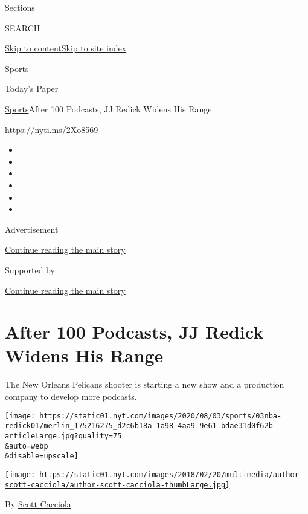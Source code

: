 Sections

SEARCH

\protect\hyperlink{site-content}{Skip to
content}\protect\hyperlink{site-index}{Skip to site index}

\href{https://www.nytimes.com/section/sports}{Sports}

\href{https://myaccount.nytimes.com/auth/login?response_type=cookie\&client_id=vi}{}

\href{https://www.nytimes.com/section/todayspaper}{Today's Paper}

\href{/section/sports}{Sports}\textbar{}After 100 Podcasts, JJ Redick
Widens His Range

\url{https://nyti.ms/2Xo8569}

\begin{itemize}
\item
\item
\item
\item
\item
\item
\end{itemize}

Advertisement

\protect\hyperlink{after-top}{Continue reading the main story}

Supported by

\protect\hyperlink{after-sponsor}{Continue reading the main story}

\hypertarget{after-100-podcasts-jj-redick-widens-his-range}{%
\section{After 100 Podcasts, JJ Redick Widens His
Range}\label{after-100-podcasts-jj-redick-widens-his-range}}

The New Orleans Pelicans shooter is starting a new show and a production
company to develop more podcasts.

\texttt{[image: https://static01.nyt.com/images/2020/08/03/sports/03nba-redick01/merlin\_175216275\_d2c6b18a-1a98-4aa9-9e61-bdae31d0f62b-articleLarge.jpg?quality=75\\\&auto=webp\\\&disable=upscale]}

\href{https://www.nytimes.com/by/scott-cacciola}{\texttt{[image: https://static01.nyt.com/images/2018/02/20/multimedia/author-scott-cacciola/author-scott-cacciola-thumbLarge.jpg]}}

By \href{https://www.nytimes.com/by/scott-cacciola}{Scott Cacciola}

